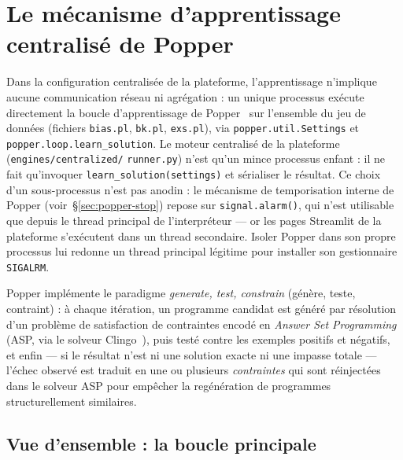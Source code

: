 
\section{Le mécanisme d'apprentissage centralisé de Popper}
\label{sec:popper-centralise}

Dans la configuration centralisée de la plateforme, l'apprentissage
n'implique aucune communication réseau ni agrégation : un unique
processus exécute directement la boucle d'apprentissage de
Popper~\cite{cropper2021popper} sur l'ensemble du jeu de données
(fichiers \texttt{bias.pl}, \texttt{bk.pl}, \texttt{exs.pl}), via
\texttt{popper.util.Settings} et \texttt{popper.loop.learn\_solution}.
Le moteur centralisé de la plateforme (\texttt{engines/centralized/}
\texttt{runner.py}) n'est qu'un mince processus enfant : il ne fait
qu'invoquer \texttt{learn\_solution(settings)} et sérialiser le résultat.
Ce choix d'un sous-processus n'est pas anodin : le mécanisme de
temporisation interne de Popper (voir~\S\ref{sec:popper-stop}) repose
sur \texttt{signal.alarm()}, qui n'est utilisable que depuis le thread
principal de l'interpréteur --- or les pages Streamlit de la plateforme
s'exécutent dans un thread secondaire. Isoler Popper dans son propre
processus lui redonne un thread principal légitime pour installer son
gestionnaire \texttt{SIGALRM}.

Popper implémente le paradigme \emph{generate, test, constrain}
(génère, teste, contraint) : à chaque itération, un programme candidat
est généré par résolution d'un problème de satisfaction de contraintes
encodé en \emph{Answer Set Programming} (ASP, via le solveur
Clingo~\cite{gebser2019multi}), puis testé contre les exemples positifs
et négatifs, et enfin --- si le résultat n'est ni une solution exacte ni
une impasse totale --- l'échec observé est traduit en une ou plusieurs
\emph{contraintes} qui sont réinjectées dans le solveur ASP pour
empêcher la regénération de programmes structurellement similaires.

\subsection{Vue d'ensemble : la boucle principale}

